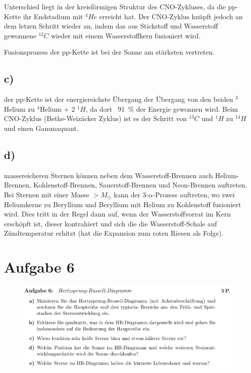 \justifying Unterschied liegt in der kreisförmigen Struktur des CNO-Zykluses, da die pp-Kette ihr Endstadium mit $^4He$ erreicht hat. Der CNO-Zyklus knüpft jedoch an dem letzen Schritt wieder
an, indem das aus Stickstoff und Wasserstoff gewonnene $^{12}C$ wieder mit einem Wasserstoffkern fusioniert wird. 


\justifying Fusionsprozess der pp-Kette ist bei der Sonne am stärksten vertreten.

\subsection{c)}
\justifying der pp-Kette ist der energiereichste Übergang der Übergang von den beiden $^3$Helium zu $^4$Helium + 2 $^1H$, da dort ~\SI{91}{\percent} der Energie gewonnen wird. 
Beim CNO-Zyklus (Bethe-Weizäcker Zyklus) ist es der Schritt von $^{13}C$ und $^1H$ zu $^{14}H$ und einen Gammaquant.


\subsection{d)}
\justifying massereicheren Sternen können neben dem Wasserstoff-Brennen auch Helium-Brennen, Kohlenstoff-Brennen, Sauerstoff-Brennen und Neon-Brennen auftreten. 
Bei Sternen mit einer Masse $>M_{\odot}$ kann der 3-$\alpha$-Prozess auftreten, wo zwei Heliumkerne zu Beryllium und Beryllium mit Helium zu Kohlenstoff fusioniert wird.
Dies tritt in der Regel dann auf, wenn der Wasserstoffvorrat im Kern erschöpft ist, dieser kontrahiert und sich die die Wasserstoff-Schale auf Zündtemperatur erhitzt (hat die
Expansion zum roten Riesen als Folge).


\section{Aufgabe 6}

\begin{figure}[H]
    \centering
    \includegraphics[width=\textwidth]{images/Aufgabe6.jpg}
    \label{fig:3}
\end{figure}


